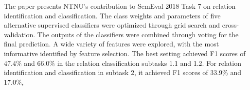 The paper presents NTNU's contribution to SemEval-2018 Task 7 on relation identification and classification. The class weights and parameters of five alternative supervised classifiers were optimized through grid search and cross-validation. The outputs of the classifiers were combined through voting for the final prediction. A wide variety of features were explored, with the most informative identified by feature selection. The best setting achieved F1 scores of 47.4\% and 66.0\% in the relation classification subtasks 1.1 and 1.2. For relation identification and classification in subtask 2, it achieved F1 scores of 33.9\% and 17.0\%,
